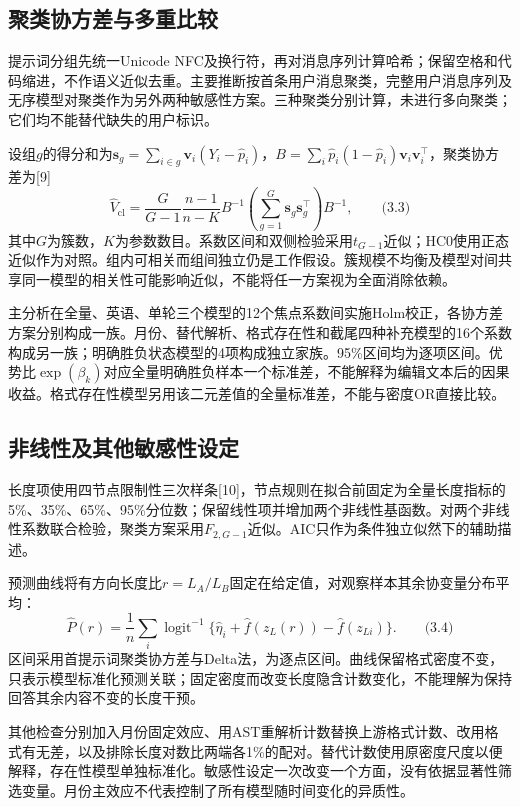 \documentclass[UTF8,11pt,a4paper,fontset=windows]{ctexart}
\numberwithin{equation}{section}
\begin{document}
\subsection{聚类协方差与多重比较}
提示词分组先统一Unicode NFC及换行符，再对消息序列计算哈希；保留空格和代码缩进，不作语义近似去重。主要推断按首条用户消息聚类，完整用户消息序列及无序模型对聚类作为另外两种敏感性方案。三种聚类分别计算，未进行多向聚类；它们均不能替代缺失的用户标识。

设组$g$的得分和为$\bm s_g=\sum_{i\in g}\bm v_i(Y_i-\widehat p_i)$，$B=\sum_i\widehat p_i(1-\widehat p_i)\bm v_i\bm v_i^\top$，聚类协方差为[9]
\[\widehat V_{\mathrm{cl}}=\frac{G}{G-1}\frac{n-1}{n-K}
 B^{-1}\left(\sum_{g=1}^G\bm s_g\bm s_g^\top\right)B^{-1},\qquad\text{(3.3)}\]
其中$G$为簇数，$K$为参数数目。系数区间和双侧检验采用$t_{G-1}$近似；HC0使用正态近似作为对照。组内可相关而组间独立仍是工作假设。簇规模不均衡及模型对间共享同一模型的相关性可能影响近似，不能将任一方案视为全面消除依赖。

主分析在全量、英语、单轮三个模型的12个焦点系数间实施Holm校正，各协方差方案分别构成一族。月份、替代解析、格式存在性和截尾四种补充模型的16个系数构成另一族；明确胜负状态模型的4项构成独立家族。95\%区间均为逐项区间。优势比$\exp(\beta_k)$对应全量明确胜负样本一个标准差，不能解释为编辑文本后的因果收益。格式存在性模型另用该二元差值的全量标准差，不能与密度OR直接比较。

\subsection{非线性及其他敏感性设定}
长度项使用四节点限制性三次样条[10]，节点规则在拟合前固定为全量长度指标的5\%、35\%、65\%、95\%分位数；保留线性项并增加两个非线性基函数。对两个非线性系数联合检验，聚类方案采用$F_{2,G-1}$近似。AIC只作为条件独立似然下的辅助描述。

预测曲线将有方向长度比$r=L_A/L_B$固定在给定值，对观察样本其余协变量分布平均：
\[\widehat P(r)=\frac1n\sum_i\operatorname{logit}^{-1}
 \{\widehat\eta_i+\widehat f(z_L(r))-\widehat f(z_{Li})\}.\qquad\text{(3.4)}\]
区间采用首提示词聚类协方差与Delta法，为逐点区间。曲线保留格式密度不变，只表示模型标准化预测关联；固定密度而改变长度隐含计数变化，不能理解为保持回答其余内容不变的长度干预。

其他检查分别加入月份固定效应、用AST重解析计数替换上游格式计数、改用格式有无差，以及排除长度对数比两端各1\%的配对。替代计数使用原密度尺度以便解释，存在性模型单独标准化。敏感性设定一次改变一个方面，没有依据显著性筛选变量。月份主效应不代表控制了所有模型随时间变化的异质性。
\end{document}
